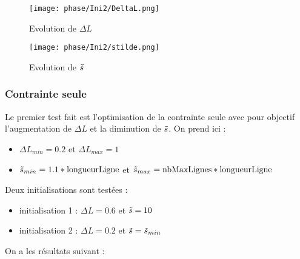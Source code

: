 \documentclass[11pt,a4paper]{article}
\begin{document}
\begin{itemize}
	\begin{figure}[H]
		\begin{minipage}{0.45\textwidth}
			\centering
			\texttt{[image: phase/Ini2/DeltaL.png]}
			\caption{Evolution de $\Delta L$}
		\end{minipage}
		\begin{minipage}{0.45\textwidth}
			\centering
			\texttt{[image: phase/Ini2/stilde.png]}
			\caption{Evolution de $\tilde{s}$}
		\end{minipage}
	\end{figure}
	
\end{itemize}


\subsubsection*{Contrainte seule}
Le premier test fait est l'optimisation de la contrainte seule avec pour objectif l'augmentation de $\Delta L$ et la diminution de $\tilde{s}$. On prend ici :
\begin{itemize}
	\item $\Delta L_{min}=0.2$ et $\Delta L_{max}=1$
	\item $\tilde{s}_{min}=1.1*\textrm{longueurLigne}$ et $\tilde{s}_{max}=\textrm{nbMaxLignes}*\textrm{longueurLigne}$
\end{itemize}
Deux initialisations sont testées :
\begin{itemize}
	\item initialisation 1 : $\Delta L=0.6$ et $\tilde{s}=10$
	\item initialisation 2 : $\Delta L=0.2$ et $\tilde{s}=\tilde{s}_{min}$
\end{itemize}

On a les résultats suivant :
\end{document}
